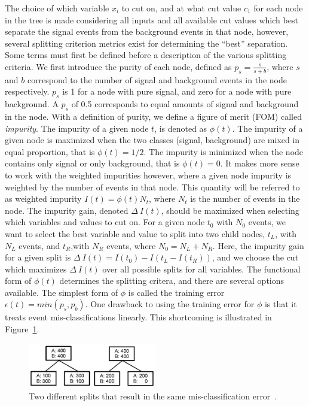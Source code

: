 The choice of which variable $x_{i}$ to cut on, and at what cut value $c_{1}$ for each node
in the tree is made considering all inputs and all available cut values which best separate the signal events from the background events in that node, however, 
several splitting criterion metrics exist for determining the ``best'' separation. 
Some terms must first be defined before a description of the various splitting criteria.
We first introduce the purity of each node, defined as $p_{s}=\frac{s}{s+b}$, where $s$ and $b$ correspond to the number of signal and background
events in the node respectively. $p_{s}$ is 1 for a node with pure signal, and zero for a node with pure background. A $p_{s}$ of 0.5 corresponds to equal amounts
of signal and background in the node.
With a definition of purity, we define a figure of merit (FOM) called \textit{impurity}. The impurity of a given node $t$, is denoted as $\phi(t)$.
The impurity of a given node is maximized when the two classes (signal, background) are mixed in equal proportion, that is $\phi(t) = 1/2$.
The impurity is minimized when the node contains only signal or only background, that is $\phi(t) = 0$.
It makes more sense to work with the weighted impurities however, where a given node impurity is weighted by the number of events in that node. This quantity
will be referred to as weighted impurity $I(t) = \phi(t)N_{t}$, where $N_{t}$ is the number of events in the node. 
The impurity gain, denoted $\Delta~I(t)$, should be maximized when selecting which variables and values to cut on. For a given node $t_{0}$ with $N_{0}$ events, we want to
select the best variable and value to split into two child nodes, $t_{L}$, with $N_{L}$ events, and $t_{R}$,with $N_{R}$ events, where $N_{0} = N_{L} + N_{R}$. Here, the
impurity gain for a given split is $\Delta~I(t) = I(t_{0}) - I(t_{L} - I(t_{R}))$, and we choose the cut which maximizes $\Delta~I(t)$ over all possible splits for all variables.
The functional form of $\phi(t)$ determines the splitting critera, and there are several options available.
The simplest form of $\phi$ is called the training error $\epsilon(t) = min(p_{s},p_{b})$.
One drawback to using the training error for $\phi$ is that it treats event mis-classifications linearly. This shortcoming is illustrated in Figure~\ref{fig:tree_split}.

\begin{figure}[hbtp]
 \begin{center}
   \includegraphics[width=0.5\textwidth]{ap2_figs/tree_split.pdf}
   \caption[Two splits with the same error rate.]{Two different splits that result in the same mis-classification error~\cite{illya}.}
   \label{fig:tree_split}
 \end{center}
\end{figure}

